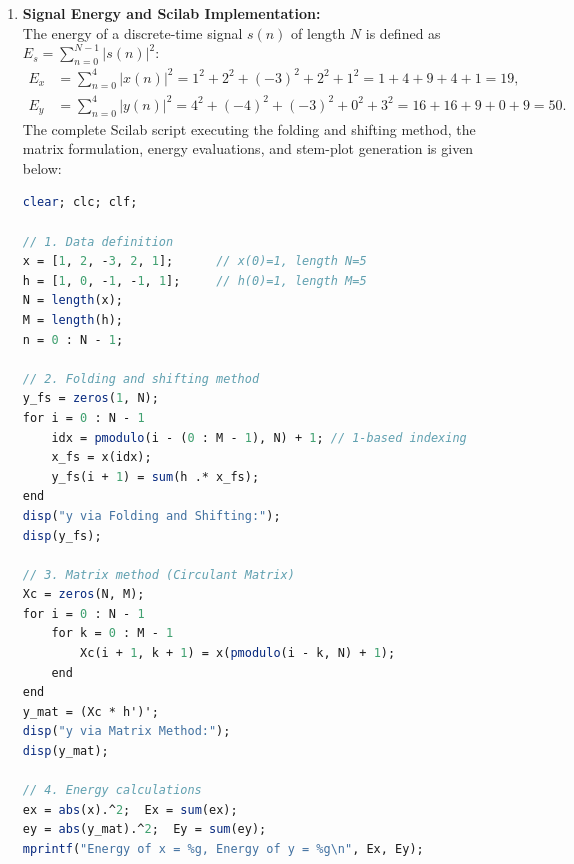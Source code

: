 \documentclass[12pt,a4paper]{article}
\begin{document}
\begin{enumerate}
\begin{equation}
\begin{bmatrix}
            1 \\ 0 \\ -1 \\ -1 \\ 1
        \end{bmatrix} =
        \begin{bmatrix}
            4 \\ -4 \\ -3 \\ 0 \\ 3
        \end{bmatrix}.
    \end{equation}
    The matrix calculation yields $y(n) = [4 \uparrow, -4, -3, 0, 3]$, which exactly matches the folding and shifting result.

    \item \textbf{Signal Energy and Scilab Implementation:}\\[0.5ex]
    The energy of a discrete-time signal $s(n)$ of length $N$ is defined as $E_s = \sum_{n=0}^{N-1} |s(n)|^2$:
    \begin{align*}
        E_x &= \sum_{n=0}^{4} |x(n)|^2 = 1^2 + 2^2 + (-3)^2 + 2^2 + 1^2 = 1 + 4 + 9 + 4 + 1 = 19, \\
        E_y &= \sum_{n=0}^{4} |y(n)|^2 = 4^2 + (-4)^2 + (-3)^2 + 0^2 + 3^2 = 16 + 16 + 9 + 0 + 9 = 50.
    \end{align*}
    The complete Scilab script executing the folding and shifting method, the matrix formulation, energy evaluations, and stem-plot generation is given below:

\begin{lstlisting}[language=Scilab, caption={Circular convolution, energy computation, and visualization in Scilab}]
clear; clc; clf;

// 1. Data definition
x = [1, 2, -3, 2, 1];      // x(0)=1, length N=5
h = [1, 0, -1, -1, 1];     // h(0)=1, length M=5
N = length(x);
M = length(h);
n = 0 : N - 1;

// 2. Folding and shifting method
y_fs = zeros(1, N);
for i = 0 : N - 1
    idx = pmodulo(i - (0 : M - 1), N) + 1; // 1-based indexing
    x_fs = x(idx);
    y_fs(i + 1) = sum(h .* x_fs);
end
disp("y via Folding and Shifting:");
disp(y_fs);

// 3. Matrix method (Circulant Matrix)
Xc = zeros(N, M);
for i = 0 : N - 1
    for k = 0 : M - 1
        Xc(i + 1, k + 1) = x(pmodulo(i - k, N) + 1);
    end
end
y_mat = (Xc * h')';
disp("y via Matrix Method:");
disp(y_mat);

// 4. Energy calculations
ex = abs(x).^2;  Ex = sum(ex);
ey = abs(y_mat).^2;  Ey = sum(ey);
mprintf("Energy of x = %g, Energy of y = %g\n", Ex, Ey);


\end{lstlisting}
\end{enumerate}
\end{document}
